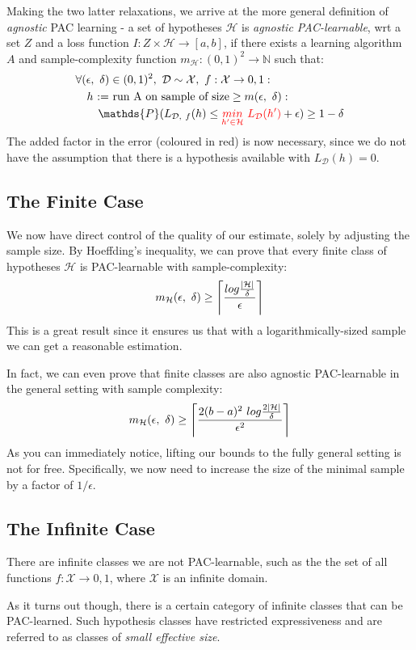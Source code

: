 \documentclass[11pt]{sigplanconf}
\DeclarePairedDelimiter{\ceil}{\lceil}{\rceil}
\newcommand\todo[1]{\textcolor{red}{#1}}
\renewcommand\it{\textit}
\renewcommand\H{\mathcal{H}}
\newcommand\D{\mathcal{D}}
\newcommand\X{\mathcal{X}}
\renewcommand\P{\mathds{P}}
\newcommand\N{\mathds{N}}
\begin{document}
Making the two latter relaxations, we arrive at the more general definition of \it{agnostic} PAC learning - a set of hypotheses $\H$ is \it{agnostic PAC-learnable}, wrt a set $Z$ and a loss function $I:Z\times\H\to[a, b]$, if there exists a learning algorithm $A$ and sample-complexity function $m_{\H}:(0,1)^2 \to \N$ such that:
\begin{align*}
&\forall (\epsilon,\ \delta)\in(0,1)^2,\ \D \sim \X,\ f:\X\to{0,1}: \\
&\quad h \ \text{:= run A on sample of size} \geq m(\epsilon,\ \delta): \\
&\quad \quad \P(L_{\D,\ f}(h) \leq \todo{\underset{h'\in\H}{min}\ L_{\D}(h')} + \epsilon) \geq 1 - \delta
\end{align*}
The added factor in the error (coloured in red) is now necessary, since we do not have the assumption that there is a hypothesis available with $L_{\D}(h) = 0$.

\subsection{The Finite Case}
We now have direct control of the quality of our estimate, solely by adjusting the sample size. By Hoeffding's inequality, we can prove that every finite class of hypotheses $\H$ is PAC-learnable with sample-complexity:
\[ m_{\H}(\epsilon,\ \delta) \geq \ceil[\Bigg]{\frac{log\frac{|\H|}{\delta}}{\epsilon}}
\]
This is a great result since it ensures us that with a logarithmically-sized sample we can get a reasonable estimation.

In fact, we can even prove that finite classes are also agnostic PAC-learnable in the general setting with sample complexity:
\[ m_{\H}(\epsilon,\ \delta) \geq \ceil[\Bigg]{\frac{2(b - a)^2\ log\frac{2|\H|}{\delta}}{\epsilon^2}}
\]
As you can immediately notice, lifting our bounds to the fully general setting is not for free. Specifically, we now need to increase the size of the minimal sample by a factor of $1/\epsilon$.

\subsection{The Infinite Case}
There are infinite classes we are not PAC-learnable, such as the the set of all functions $f: \X \to {0, 1}$, where $\X$ is an infinite domain.

As it turns out though, there is a certain category of infinite classes that can be PAC-learned. Such hypothesis classes have restricted expressiveness and are referred to as classes of \it{small effective size}.
\end{document}
